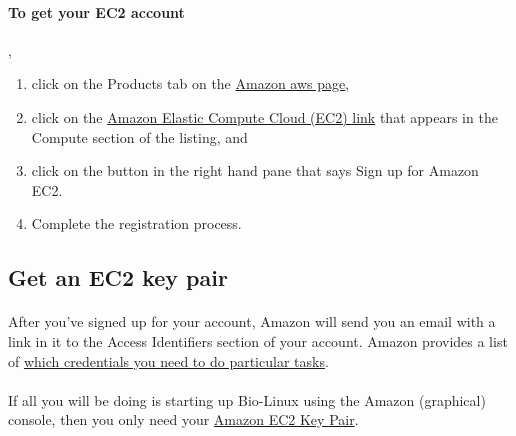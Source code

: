 \paragraph{To get your EC2 account}, 
\begin{enumerate}
\item click on the Products tab on the \href{http://aws.amazon.com}{Amazon aws page},
\item click on the \href{http://aws.amazon.com/ec2/}{Amazon Elastic Compute Cloud (EC2) link} that appears in the Compute section of the listing, and
\item click on the button in the right hand pane that says Sign up for Amazon EC2.  
\item Complete the registration process.
\end{enumerate}

\subsection{Get an EC2 key pair}

\paragraph{}After you've signed up for your account, Amazon will send you an email with a link in it to the Access Identifiers section of your account. Amazon provides a list of \href{http://docs.amazonwebservices.com/AWSSecurityCredentials/1.0/AboutAWSCredentials.html#EC2Credentials}{which credentials you need to do particular tasks}. 

\paragraph{}If all you will be doing is starting up Bio-Linux using the Amazon (graphical) console, then you only need your \href{http://docs.amazonwebservices.com/AWSSecurityCredentials/1.0/AboutAWSCredentials.html#EC2KeyPairs}{Amazon EC2 Key Pair}. 

